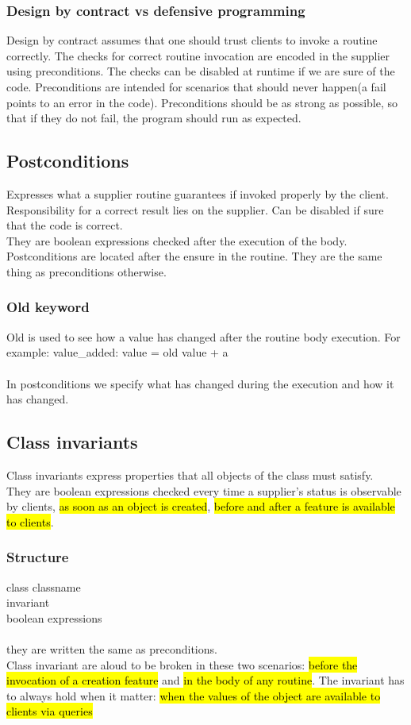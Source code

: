 \documentclass[11pt]{article}
\newcommand\tab[1][1cm]{\hspace*{#1}}
\begin{document}
\subsubsection{Design by contract vs defensive programming}
Design by contract assumes that one should trust clients to invoke a routine correctly. The checks for correct routine invocation are encoded in the supplier using preconditions. The checks can be disabled at runtime if we are sure of the code. Preconditions are intended for scenarios that should never happen(a fail points to an error in the code). Preconditions should be as strong as possible, so that if they do not fail, the program should run as expected.
\subsection{Postconditions}
Expresses what a supplier routine guarantees if invoked properly by the client. Responsibility for a correct result lies on the supplier. Can be disabled if sure that the code is correct.\\They are boolean expressions checked after the execution of the body.\\Postconditions are located after the ensure in the routine. They are the same thing as preconditions otherwise.
\subsubsection{Old keyword}
Old is used to see how a value has changed after the routine body execution. For example: value\_added: value = old value + a\\\\In postconditions we specify what has changed during the execution and how it has changed.
\subsection{Class invariants}
Class invariants express properties that all objects of the class must satisfy.\\They are boolean expressions checked every time a supplier's status is observable by clients, \hl{as soon as an object is created}, \hl{before and after a feature is available to clients}.
\subsubsection{Structure}
class classname\\invariant\\\tab boolean expressions\\\\
they are written the same as preconditions.\\Class invariant are aloud to be broken in these two scenarios: \hl{before the invocation of a creation feature} and \hl{in the body of any routine}. The invariant has to always hold when it matter: \hl{when the values of the object are available to clients via queries}
\end{document}
